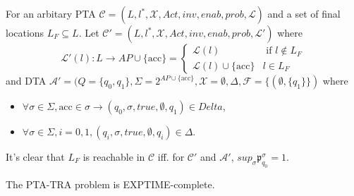 For an arbitary PTA $\mathcal{C}=(L, l^*, \mathcal{X},Act,inv,enab,prob,\mathcal{L})$ and a set of final locations $L_F\subseteq L$. Let $\mathcal{C}'=(L, l^*, \mathcal{X},Act,inv,enab,prob,\mathcal{L}')$ where
\begin{displaymath}
    \mathcal{L}'(l):L\rightarrow AP\cup\{\mbox{acc}\}=\left\{
    \begin{array}{cc}
        \mathcal{L}(l) & \mbox{ if } l\not\in L_F\\
        \mathcal{L}(l)\cup\{\mbox{acc}\} & l\in L_F
    \end{array}
    \right.
\end{displaymath}
and DTA $\mathcal{A}'=(Q=\{q_0,q_1\},\Sigma=2^{AP\cup\{\mbox{acc\}}},\mathcal{X}=\emptyset,\Delta,\mathcal{F}=\{(\emptyset, \{q_1\}\})$ where
\begin{itemize}
    \item $\forall \sigma\in\Sigma, \mbox{acc}\in \sigma \rightarrow (q_0,\sigma,true, \emptyset,q_1)\in Delta$,
    \item $\forall \sigma\in\Sigma, i=0,1, (q_i,\sigma,true,\emptyset,q_i)\in \Delta$.
\end{itemize}
It's clear that $L_F$ is reachable in $\mathcal{C}$ iff. for $\mathcal{C}'$ and $\mathcal{A}'$, $sup_\sigma \mathfrak{p}_{q_0}^\sigma=1$. 

\begin{proposition}
    The PTA-TRA problem is EXPTIME-complete.
\end{proposition}
%
%
